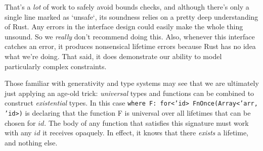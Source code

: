 That's a \emph{lot} of work to safely avoid bounds checks, and although there's
only a single line marked as `unsafe`, its soundness relies on a pretty deep
understanding of Rust. Any errors in the interface design could easily make
the whole thing unsound. So we \emph{really} don't recommend doing this. Also, whenever
this interface catches an error, it produces nonsensical lifetime errors because
Rust has no idea what we're doing. That said, it does demonstrate our ability to
model particularly complex constraints.

Those familiar with generativity and type systems may see that we are ultimately
just applying an age-old trick: \emph{universal} types and functions can be combined to
construct \emph{existential} types. In this case
\texttt{where F: for<'id> FnOnce(Array<'arr, 'id>)}
is declaring that the function F is universal over all lifetimes that can be chosen
for $id$. The body of any function that satisfies this signature must work with any
$id$ it receives opaquely. In effect, it knows that there \emph{exists} a lifetime,
and nothing else.


